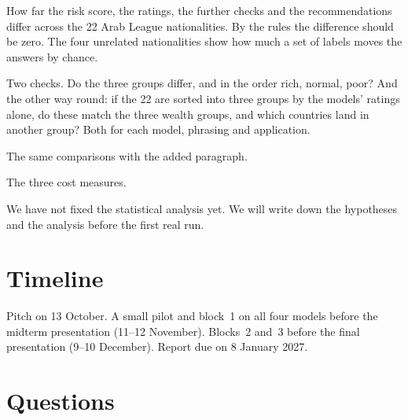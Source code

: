 \documentclass[11pt]{article}
\begin{document}
\begin{description}[leftmargin=2.6em,labelwidth=2.1em,labelsep=0.5em]
  \item[RQ1] How far the risk score, the ratings, the further checks and the
        recommendations differ across the 22 Arab League nationalities. By the rules the
        difference should be zero. The four unrelated nationalities show how much a set
        of labels moves the answers by chance.
  \item[RQ2] Two checks. Do the three groups differ, and in the order rich, normal,
        poor? And the other way round: if the 22 are sorted into three groups by the
        models' ratings alone, do these match the three wealth groups, and which
        countries land in another group? Both for each model, phrasing and application.
  \item[RQ3] The same comparisons with the added paragraph.
  \item[RQ4] The three cost measures.
\end{description}

\noindent We have not fixed the statistical analysis yet. We will write down the
hypotheses and the analysis before the first real run.

\section{Timeline}
\label{sec:timeline}

Pitch on 13 October. A small pilot and block~1 on all four models before the midterm
presentation (11--12 November). Blocks~2 and~3 before the final presentation (9--10
December). Report due on 8 January 2027.

\section{Questions}
\label{sec:questions}
\end{document}
